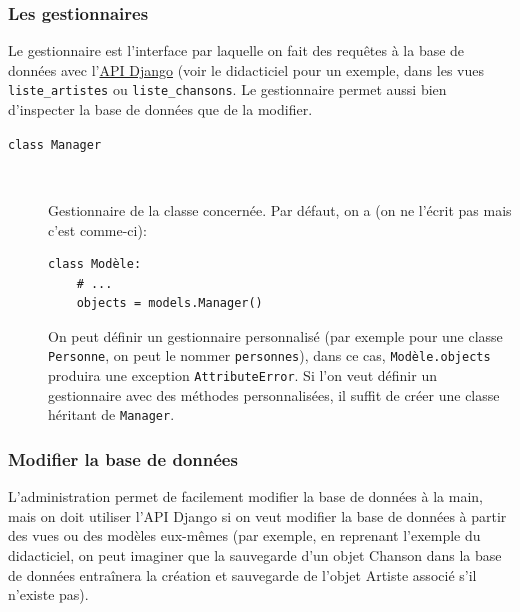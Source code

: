\documentclass[a4paper, 10pt]{article}
\begin{document}
{\subsubsection{Les gestionnaires}
Le gestionnaire  est l'interface par laquelle on fait des requêtes à la base de données avec l'\href{https://docs.djangoproject.com/fr/2.0/topics/db/queries/}{API Django} (voir le didacticiel pour un exemple, dans les vues \texttt{liste\_artistes} ou \texttt{liste\_chansons}. Le gestionnaire permet aussi bien d'inspecter la base de données que de la modifier.

\begin{description}
    \item[\texttt{class Manager}]~

    Gestionnaire de la classe concernée. Par défaut, on a (on ne l'écrit pas mais c'est comme-ci):
    \begin{verbatim}
class Modèle:
    # ...
    objects = models.Manager()
    \end{verbatim}

    On peut définir un gestionnaire personnalisé (par exemple pour une classe \texttt{Personne}, on peut le nommer \texttt{personnes}), dans ce cas, \texttt{Modèle.objects} produira une exception \texttt{AttributeError}. Si l'on veut définir un gestionnaire avec des méthodes personnalisées, il suffit de créer une classe héritant de \texttt{Manager}.
\end{description}

\subsubsection{Modifier la base de données}
L'administration  permet de facilement modifier la base de données à la main, mais on doit utiliser l'API Django si on veut modifier la base de données à partir des vues ou des modèles eux-mêmes (par exemple, en reprenant l'exemple du didacticiel, on peut imaginer que la sauvegarde d'un objet Chanson dans la base de données entraînera la création et sauvegarde de l'objet Artiste associé s'il n'existe pas).\bigskip

}
\end{document}
